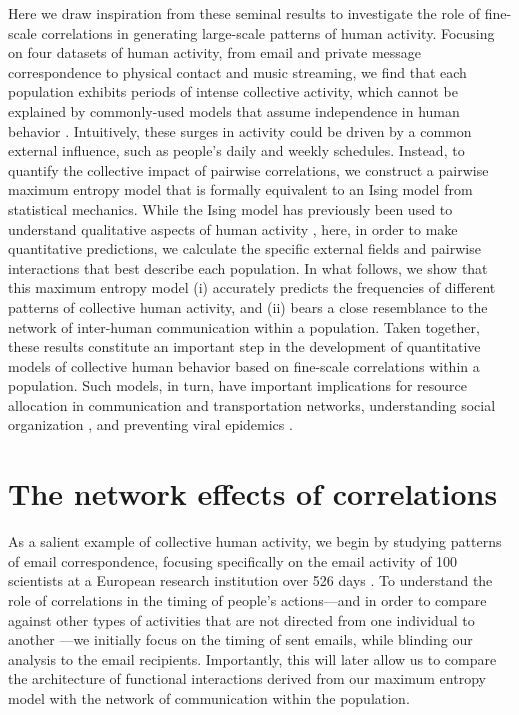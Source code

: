 \documentclass[aps,reprint,superscriptaddress,amsmath,amssymb,longbibliography]{revtex4-1}
\begin{document}
Here we draw inspiration from these seminal results to investigate the role of fine-scale correlations in generating large-scale patterns of human activity. Focusing on four datasets of human activity, from email and private message correspondence to physical contact and music streaming, we find that each population exhibits periods of intense collective activity, which cannot be explained by commonly-used models that assume independence in human behavior \cite{Haight-01,Rasch-01,Karagiannis-01,Gerlough-01}. Intuitively, these surges in activity could be driven by a common external influence, such as people's daily and weekly schedules. Instead, to quantify the collective impact of pairwise correlations, we construct a pairwise maximum entropy model that is formally equivalent to an Ising model from statistical mechanics. While the Ising model has previously been used to understand qualitative aspects of human activity \cite{Castellano-01,Galam-02,Galam-05,Galam-01,Lynn-01}, here, in order to make quantitative predictions, we calculate the specific external fields and pairwise interactions that best describe each population. In what follows, we show that this maximum entropy model (i) accurately predicts the frequencies of different patterns of collective human activity, and (ii) bears a close resemblance to the network of inter-human communication within a population. Taken together, these results constitute an important step in the development of quantitative models of collective human behavior based on fine-scale correlations within a population. Such models, in turn, have important implications for resource allocation in communication \cite{Candia-01} and transportation \cite{Peng-01} networks, understanding social organization \cite{Onnela-01}, and preventing viral epidemics \cite{Pastor-01}.

\section{The network effects of correlations}

As a salient example of collective human activity, we begin by studying patterns of email correspondence, focusing specifically on the email activity of 100 scientists at a European research institution over 526 days \cite{Paranjape-01, Panzarasa-01}. To understand the role of correlations in the timing of people's actions---and in order to compare against other types of activities that are not directed from one individual to another \cite{Crane-01,Peng-01,Bagrow-01,Sornette-01,Deschatres-01}---we initially focus on the timing of sent emails, while blinding our analysis to the email recipients. Importantly, this will later allow us to compare the architecture of functional interactions derived from our maximum entropy model with the network of communication within the population. 
\end{document}
